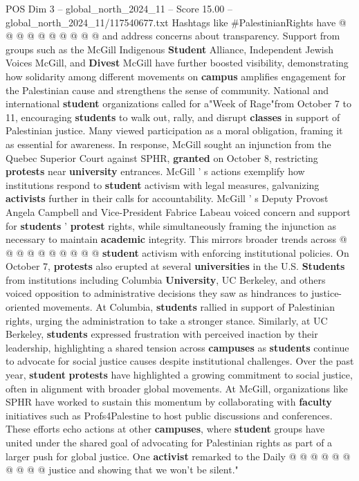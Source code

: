 \begin{textsample}{POS Dim 3 – global\_north\_2024\_11 – Score 15.00 – global\_north\_2024\_11/117540677.txt}
Hashtags like \#PalestinianRights have @ @ @ @ @ @ @ @ @ @ and address concerns about transparency.
Support from groups such as the McGill Indigenous \textbf{Student} Alliance, Independent Jewish Voices McGill, and \textbf{Divest} McGill have further boosted visibility, demonstrating how solidarity among different movements on \textbf{campus} amplifies engagement for the Palestinian cause and strengthens the sense of community.
National and international \textbf{student} organizations called for a"Week of Rage"from October 7 to 11, encouraging \textbf{students} to walk out, rally, and disrupt \textbf{classes} in support of Palestinian justice.
Many viewed participation as a moral obligation, framing it as essential for awareness.
In response, McGill sought an injunction from the Quebec Superior Court against SPHR, \textbf{granted} on October 8, restricting \textbf{protests} near \textbf{university} entrances.
McGill ' s actions exemplify how institutions respond to \textbf{student} activism with legal measures, galvanizing \textbf{activists} further in their calls for accountability.
McGill ' s Deputy Provost Angela Campbell and Vice-President Fabrice Labeau voiced concern and support for \textbf{students} ' \textbf{protest} rights, while simultaneously framing the injunction as necessary to maintain \textbf{academic} integrity.
This mirrors broader trends across @ @ @ @ @ @ @ @ @ @ \textbf{student} activism with enforcing institutional policies.
On October 7, \textbf{protests} also erupted at several \textbf{universities} in the U.S. \textbf{Students} from institutions including Columbia \textbf{University}, UC Berkeley, and others voiced opposition to administrative decisions they saw as hindrances to justice-oriented movements.
At Columbia, \textbf{students} rallied in support of Palestinian rights, urging the administration to take a stronger stance.
Similarly, at UC Berkeley, \textbf{students} expressed frustration with perceived inaction by their leadership, highlighting a shared tension across \textbf{campuses} as \textbf{students} continue to advocate for social justice causes despite institutional challenges.
Over the past year, \textbf{student} \textbf{protests} have highlighted a growing commitment to social justice, often in alignment with broader global movements.
At McGill, organizations like SPHR have worked to sustain this momentum by collaborating with \textbf{faculty} initiatives such as Profs4Palestine to host public discussions and conferences.
These efforts echo actions at other \textbf{campuses}, where \textbf{student} groups have united under the shared goal of advocating for Palestinian rights as part of a larger push for global justice.
One \textbf{activist} remarked to the Daily @ @ @ @ @ @ @ @ @ @ justice and showing that we won't be silent."

\end{textsample}
